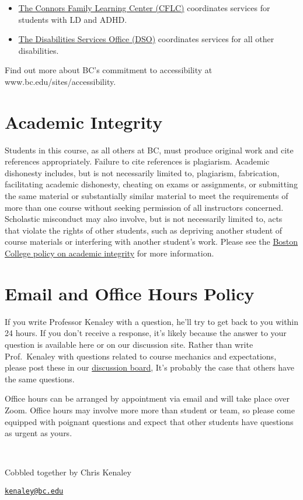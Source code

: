 \documentclass[
]{article}
\providecommand{\tightlist}{%
  \setlength{\itemsep}{0pt}\setlength{\parskip}{0pt}}
\begin{document}
\begin{itemize}
\tightlist
\item
  \href{http://www.bc.edu/libraries/help/tutoring.html}{The Connors
  Family Learning Center (CFLC)} coordinates services for students with
  LD and ADHD.
\item
  \href{http://www.bc.edu/offices/dos/subsidiary_offices/disabilityservices.html}{The
  Disabilities Services Office (DSO)} coordinates services for all other
  disabilities.
\end{itemize}

Find out more about BC's commitment to accessibility at
www.bc.edu/sites/accessibility.

\hypertarget{academic-integrity}{%
\section{Academic Integrity}\label{academic-integrity}}

Students in this course, as all others at BC, must produce original work
and cite references appropriately. Failure to cite references is
plagiarism. Academic dishonesty includes, but is not necessarily limited
to, plagiarism, fabrication, facilitating academic dishonesty, cheating
on exams or assignments, or submitting the same material or
substantially similar material to meet the requirements of more than one
course without seeking permission of all instructors concerned.
Scholastic misconduct may also involve, but is not necessarily limited
to, acts that violate the rights of other students, such as depriving
another student of course materials or interfering with another
student's work. Please see the
\href{https://www.bc.edu/content/bc-web/academics/sites/university-catalog/policies-procedures.html\#academic_integrity_policies}{Boston
College policy on academic integrity} for more information.

\hypertarget{email-and-office-hours-policy}{%
\section{Email and Office Hours
Policy}\label{email-and-office-hours-policy}}

If you write Professor Kenaley with a question, he'll try to get back to
you within 24 hours. If you don't receive a response, it's likely
because the answer to your question is available here or on our
discussion site. Rather than write Prof.~Kenaley with questions related
to course mechanics and expectations, please post these in our
\href{https://github.com/orgs/bcorgbio/teams/biol-3140}{discussion
board}, It's probably the case that others have the same questions.

Office hours can be arranged by appointment via email and will take
place over Zoom. Office hours may involve more more than student or
team, so please come equipped with poignant questions and expect that
other students have questions as urgent as yours.

~

Cobbled together by Chris Kenaley

{\href{mailto:kenaley@bc.edu}{\nolinkurl{kenaley@bc.edu}}}

~
\end{document}
